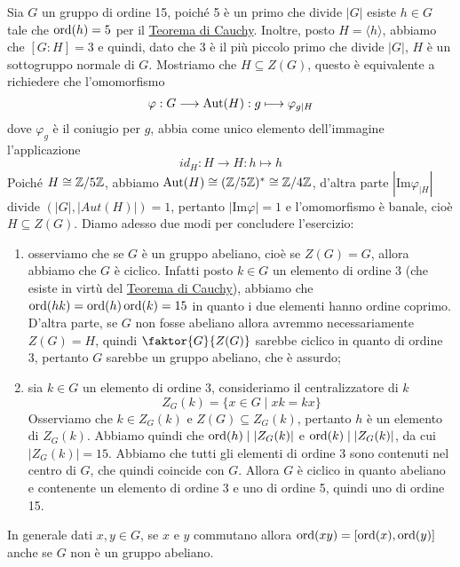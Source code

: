 \documentclass[11pt]{scrartcl}
\begin{document}
\begin{soln}
    Sia $G$ un gruppo di ordine 15, poiché 5 è un primo che divide $|G|$
    esiste $h \in G$ tale che $\operatorname{ord}(h) = 5$ per il \hyperref[teorema1.44]{Teorema di Cauchy}.
    Inoltre, posto $H = \langle h\rangle$, abbiamo che $[G:H] = 3$ e quindi,
    dato che 3 è il più piccolo primo che divide $|G|$, $H$ è un sottogruppo 
    normale di $G$. Mostriamo che $H \subseteq Z(G)$, questo è equivalente a 
    richiedere che l'omomorfismo \[
        \varphi: G\longrightarrow \operatorname{Aut}(H) :g\longmapsto \varphi_{g\mid H}
    \]
    dove $\varphi_g$ è il coniugio per $g$, abbia come unico elemento dell'immagine
    l'applicazione
    \[
        id_H:H\longrightarrow H: h \longmapsto h
    \]
    Poiché $H \cong \mathbb{Z}/{5}\mathbb{Z}$, abbiamo $\operatorname{Aut}(H)\cong (\mathbb{Z}/{5}\mathbb{Z})^* \cong \mathbb{Z}/{4}\mathbb{Z}$, d'altra 
    parte $|\mathrm{Im}\varphi_{\mid H}|$ divide $(|G|, |Aut(H)|) = 1$, pertanto
    $|\mathrm{Im}\varphi| = 1$ e l'omomorfismo è banale, cioè $H \subseteq Z(G)$.
    Diamo adesso due modi per concludere l'esercizio:
    \begin{enumerate}[(1)]
        \item osserviamo che se $G$ è un gruppo abeliano, cioè se $Z(G) = G$,
        allora abbiamo che $G$ è ciclico. Infatti posto $k \in G$ un elemento di 
        ordine 3 (che esiste in virtù del \hyperref[teorema1.44]{Teorema di Cauchy}),
        abbiamo che $\operatorname{ord}(hk) = \operatorname{ord}(h)\operatorname{ord}(k) = 15$ in quanto i due elementi hanno
        ordine coprimo. D'altra parte, se $G$ non fosse abeliano allora avremmo 
        necessariamente $Z(G) = H$, quindi $\faktor{G}{Z(G)}$ sarebbe ciclico 
        in quanto di ordine 3, pertanto $G$ sarebbe un gruppo abeliano, che è assurdo;
        \item sia $k \in G$ un elemento di ordine 3, consideriamo il centralizzatore
        di $k$
        \[
            Z_G(k) = \{x \in G\mid xk = kx\}
        \]Osserviamo che $k \in Z_G(k)$ e $Z(G) \subseteq Z_G(k)$, pertanto $h$ è un elemento 
        di $Z_G(k)$. Abbiamo quindi che $\operatorname{ord}(h)\mid |Z_G(k)|$ e $\operatorname{ord}(k)\mid |Z_G(k)|$, 
        da cui $|Z_G(k)| = 15$. Abbiamo che tutti gli elementi di ordine 3
        sono contenuti nel centro di $G$, che quindi coincide con $G$. Allora $G$
        è ciclico in quanto abeliano e contenente un elemento di ordine 3 e uno
        di ordine 5, quindi uno di ordine 15.
    \end{enumerate}
\end{soln}

\begin{remark}
    In generale dati $x, y\in G$, se $x$ e $y$ commutano allora 
    $\operatorname{ord}(xy) = [\operatorname{ord}(x), \operatorname{ord}(y)]$ anche se $G$ non è un gruppo abeliano.
\end{remark}
\end{document}
